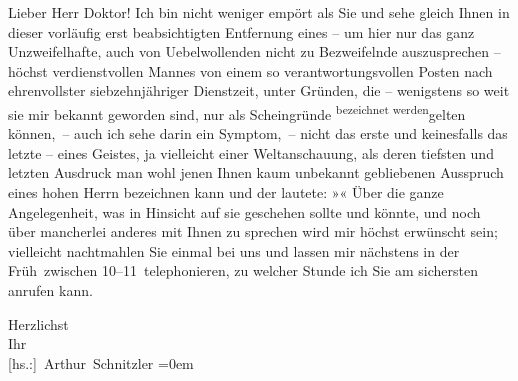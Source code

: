 \pstart\center{}Lieber Herr Doktor!\pend\vspace{0.5em}
\pstart
           Ich bin nicht weniger empört als Sie und sehe gleich Ihnen in dieser \introOben{}vorläufig erst\introOben{} beabsichtigten Entfernung eines – um hier nur
               das ganz Unzweifelhafte, auch von Uebelwollenden nicht zu Bezweifelnde auszusprechen
               – höchst verdienstvollen Mannes von einem so verantwortungsvollen Posten nach ehrenvollster
               siebzehnjähriger Dienstzeit\introOben{},\introOben{} unter Gründen, die \introOben{}–\introOben{} wenigstens so weit sie mir bekannt geworden sind, nur als
               Scheingründe \substVorne{}\textsuperscript{bezeichnet werden}\substDazwischen{}gelten\substHinten{} können, – auch ich sehe darin ein Symptom, – nicht das erste und keinesfalls
               das letzte – eines Geistes, ja vielleicht einer Weltanschauung, als deren tiefsten
               und letzten Ausdruck man wohl jenen Ihnen kaum unbekannt gebliebenen Ausspruch eines
               hohen Herrn bezeichnen kann
               und der lautete: »\label{K_L03768-1v}\label{K_L03768-1}« Über
               die ganze Angelegenheit, was in {\pb}Hinsicht auf sie
               geschehen sollte und könnte, und noch über mancherlei anderes mit Ihnen zu sprechen
               wird mir höchst erwünscht sein; vielleicht nachtmahlen Sie \label{K_L03768-2v}\label{K_L03768-2} einmal bei uns und
               lassen mir nächstens in der Früh zwischen
               10–11 telephonieren, zu welcher
               Stunde ich Sie am sichersten anrufen kann.\pend
           
\pstart
           Herzlichst{\\[\baselineskip]}Ihr{\\[\baselineskip]}\spacefill\mbox{{[}hs.:{]} Arthur Schnitzler}\pend
           \leftskip=0em{}\endnumbering{}  \newcommand{\dateiname}{L03768}\newcommand{\titel}{Arthur Schnitzler an Stefan Zweig, 9. 4. 1915}\newcommand{\editorInnen}{Selma Jahnke und Martin Anton Müller}

